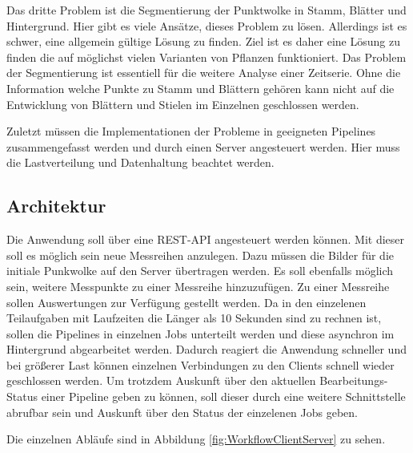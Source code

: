\documentclass[12pt,titlepage, twoside]{article}
\begin{document}
Das dritte Problem ist die Segmentierung der Punktwolke in Stamm, Blätter und Hintergrund. Hier gibt es viele Ansätze, dieses Problem zu lösen. Allerdings ist es schwer, eine allgemein gültige Lösung zu finden. 
Ziel ist es daher eine Lösung zu finden die auf möglichst vielen Varianten von Pflanzen funktioniert. 
Das Problem der Segmentierung ist essentiell für die weitere Analyse einer Zeitserie. 
Ohne die Information welche Punkte zu Stamm und Blättern gehören kann nicht auf die Entwicklung von Blättern und Stielen im Einzelnen geschlossen werden.

Zuletzt müssen die Implementationen der Probleme in geeigneten Pipelines zusammengefasst werden und durch einen Server angesteuert werden. Hier muss die Lastverteilung und Datenhaltung beachtet werden.

\subsection{Architektur}
\label{sec:realisierung:architektur}

Die Anwendung soll über eine REST-API angesteuert werden können. Mit dieser soll es möglich sein neue Messreihen anzulegen. Dazu müssen die Bilder für die initiale Punkwolke auf den Server übertragen werden. 
Es soll ebenfalls möglich sein, weitere Messpunkte zu einer Messreihe hinzuzufügen. Zu einer Messreihe sollen Auswertungen zur Verfügung gestellt werden. 
Da in den einzelenen Teilaufgaben mit Laufzeiten die Länger als 10 Sekunden sind zu rechnen ist, sollen die Pipelines in einzelnen Jobs unterteilt werden und diese asynchron im Hintergrund abgearbeitet werden.
Dadurch reagiert die Anwendung schneller und bei größerer Last können einzelnen Verbindungen zu den Clients schnell wieder geschlossen werden. 
Um trotzdem Auskunft über den aktuellen Bearbeitungs-Status einer Pipeline geben zu können, soll dieser durch eine weitere Schnittstelle abrufbar sein und Auskunft über den Status der einzelenen Jobs geben.

Die einzelnen Abläufe sind in Abbildung \ref{fig:WorkflowClientServer} zu sehen.
\end{document}
